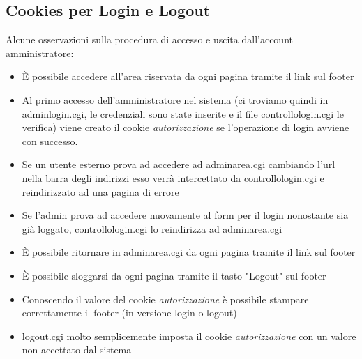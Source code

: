 \documentclass[12pt]{article}
\begin{document}
\subsection*{Cookies per Login e Logout}
Alcune osservazioni sulla procedura di accesso e uscita dall'account amministratore:
\begin{itemize}
\item \`E possibile accedere all'area riservata da ogni pagina tramite il link sul footer
\item Al primo accesso dell'amministratore nel sistema (ci troviamo quindi in adminlogin.cgi, le credenziali sono state inserite e il file controllologin.cgi le verifica) viene creato il cookie \textit{autorizzazione} se l'operazione di login avviene con successo.
\item Se un utente esterno prova ad accedere ad adminarea.cgi cambiando l'url nella barra degli indirizzi esso verr\`a intercettato da controllologin.cgi e reindirizzato ad una pagina di errore
\item Se l'admin prova ad accedere nuovamente al form per il login nonostante sia gi\`a loggato, controllologin.cgi lo reindirizza ad adminarea.cgi
\item \`E possibile ritornare in adminarea.cgi da ogni pagina tramite il link sul footer
\item \`E possibile sloggarsi da ogni pagina tramite il tasto "Logout" sul footer
\item Conoscendo il valore del cookie \textit{autorizzazione} \`e possibile stampare correttamente il footer (in versione login o logout)
\item logout.cgi molto semplicemente imposta il cookie \textit{autorizzazione} con un valore non accettato dal sistema
\end{itemize}
	
		\newpage	
\end{document}
